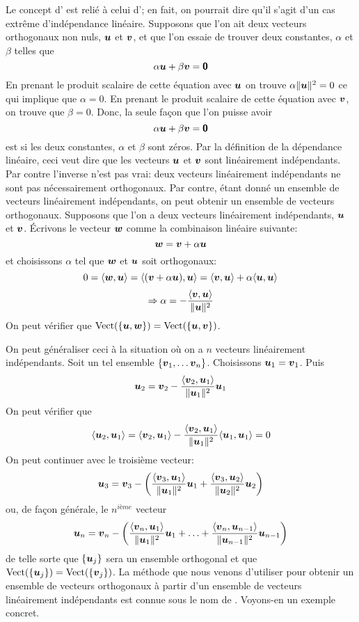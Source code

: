 Le concept d' est relié à celui d'; en fait, on pourrait dire qu'il s'agit d'un cas extrême d'indépendance
linéaire.  
Supposons que l'on ait deux vecteurs orthogonaux non nuls,  $\boldsymbol{u}$ et $\boldsymbol{v}$, 
et que l'on essaie de trouver deux constantes,
$\alpha$ et $\beta$ telles que
\[
\alpha\boldsymbol{u} + \beta\boldsymbol{v} = \mbox{\textsf{\textbf{{0}}}}
\]
En prenant le produit scalaire de cette équation avec $\boldsymbol{u}$ on trouve $\alpha \lVert\boldsymbol{u}\rVert^2 = 0$ ce qui implique que $\alpha=0$.
En prenant le produit scalaire de cette équation avec $\boldsymbol{v}$, on trouve que $\beta = 0$.  Donc, la seule façon que l'on puisse avoir
\[
\alpha\boldsymbol{u} + \beta\boldsymbol{v} = \mbox{\textsf{\textbf{{0}}}}
\]
est si les deux constantes, $\alpha$ et $\beta$ sont zéros.  
Par la définition de la dépendance linéaire, ceci veut dire que les vecteurs $\boldsymbol{u}$ et 
$\boldsymbol{v}$ sont linéairement indépendants.  Par contre l'inverse n'est pas vrai: deux
vecteurs linéairement indépendants ne sont pas nécessairement orthogonaux.  Par contre,
étant donné un ensemble de vecteurs linéairement indépendants, on peut obtenir un ensemble
de vecteurs orthogonaux. 
Supposons que l'on a deux vecteurs linéairement indépendants, $\boldsymbol{u}$ et $\boldsymbol{v}$.
Écrivons le vecteur $\boldsymbol{w}$ comme la combinaison linéaire suivante:
\[
\boldsymbol{w} = \boldsymbol{v} + \alpha\boldsymbol{u}
\]
et choisissons $\alpha$ tel que $\boldsymbol{w}$ et $\boldsymbol{u}$ soit orthogonaux:
\[
0 = \langle \boldsymbol{w}, \boldsymbol{u} \rangle = \langle (\boldsymbol{v} + \alpha\boldsymbol{u}), \boldsymbol{u}\rangle =
\langle\boldsymbol{v}, \boldsymbol{u}\rangle + \alpha \langle \boldsymbol{u}, \boldsymbol{u}\rangle
\]
\[
\Rightarrow \alpha = - \frac{\langle\boldsymbol{v}, \boldsymbol{u}\rangle}{\lVert\boldsymbol{u}\rVert^2}
\]
On peut vérifier que $\operatorname{Vect}(\{\boldsymbol{u}, \boldsymbol{w}\}) = \operatorname{Vect}(\{\boldsymbol{u}, \boldsymbol{v}\})$.

On peut généraliser ceci à la situation où on a $n$ vecteurs linéairement indépendants.
Soit un tel ensemble $\{\boldsymbol{v}_1, \ldots \boldsymbol{v}_n \}$.
Choisissons $\boldsymbol{u}_1 = \boldsymbol{v}_1$.  Puis
\[
\boldsymbol{u}_2 = \boldsymbol{v}_2 - \frac{\langle\boldsymbol{v}_2, \boldsymbol{u}_1\rangle}{\lVert\boldsymbol{u}_1\rVert^2}\boldsymbol{u}_1
\]
On peut vérifier que
\[
\langle\boldsymbol{u}_2, \boldsymbol{u}_1\rangle = \langle\boldsymbol{v}_2, \boldsymbol{u}_1\rangle  - \frac{\langle\boldsymbol{v}_2, \boldsymbol{u}_1\rangle}{\lVert\boldsymbol{u}_1\rVert^2}\langle\boldsymbol{u}_1, \boldsymbol{u}_1\rangle = 0
\]
On peut continuer avec le troisième vecteur:
\[
\boldsymbol{u}_3 = \boldsymbol{v}_3 - \left(\frac{\langle\boldsymbol{v}_3, \boldsymbol{u}_1\rangle}{\lVert\boldsymbol{u}_1\rVert^2}\boldsymbol{u}_1
+ \frac{\langle\boldsymbol{v}_3, \boldsymbol{u}_2\rangle}{\lVert\boldsymbol{u}_2\rVert^2}\boldsymbol{u}_2\right)
\]
ou, de façon générale, le $n^{ième}$ vecteur
\[
\boldsymbol{u}_n = \boldsymbol{v}_n - \left(\frac{\langle\boldsymbol{v}_n, \boldsymbol{u}_1\rangle}{\lVert\boldsymbol{u}_1\rVert^2}\boldsymbol{u}_1 + \ldots  
+ \frac{\langle\boldsymbol{v}_n, \boldsymbol{u}_{n-1}\rangle}{\lVert\boldsymbol{u}_{n-1}\rVert^2}\boldsymbol{u}_{n-1}\right)
\]
de telle sorte que $\{\boldsymbol{u}_j\}$ sera un ensemble orthogonal et que
$\operatorname{Vect}(\{\boldsymbol{u}_j\}) = \operatorname{Vect}(\{\boldsymbol{v}_j\})$. La méthode que nous venons d'utiliser pour
obtenir un ensemble de vecteurs orthogonaux à partir d'un ensemble de vecteurs
linéairement indépendants est connue sous le nom de 
. Voyons-en un exemple concret.

